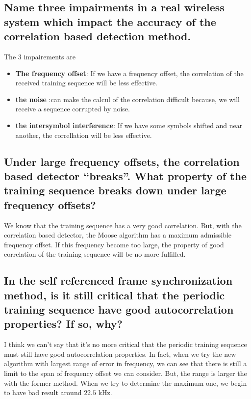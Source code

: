 \documentclass[frenchb, oneside, headings=normal]{scrartcl}
\begin{document}
\subsection{Name three impairments in a real wireless system which impact the accuracy of the correlation based detection method.}

The 3 impairements are\\ 

\begin{itemize}

\item \textbf{The frequency offset}: If we have a frequency offset, the correlation of the received training sequence will be less effective.

\item \textbf{the noise} :can make the calcul of the correlation difficult because, we will receive a sequence corrupted by noise.

\item \textbf{the intersymbol interference}: If we have some symbols shifted and near another, the correllation will be less effective.
\end{itemize}

\subsection{Under large frequency offsets, the correlation based detector “breaks”. What property of the training sequence breaks down under large frequency offsets?}

We know that the training sequence has a very good correlation. But, with the correlation based detector, the Moose algorithm has a maximum admissible frequency offset. If this frequency become too large, the property of good correlation of the training sequence will be no more fulfilled.

\subsection{In the self referenced frame synchronization method, is it still critical that the periodic training sequence have good autocorrelation properties? If so, why?}

I think we can't say that it's no more critical that the periodic training sequence must still have good autocorrelation properties. In fact, when we try the new algorithm with largest range of error in frequency, we can see that there is still a limit to the span of frequency offset we can consider. But, the range is larger the with the former method. When we try to determine the maximum one, we begin to have bad result around $22.5$ \si{\kilo\hertz}.
\end{document}
